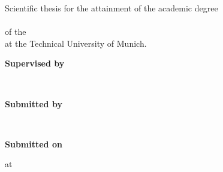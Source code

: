 \vspace*{125.2mm}
\fontsize{15pt}{17.5pt}\selectfont%
Scientific thesis for the attainment of the academic degree\\
\Grad\\
of the \Fakultaet{}\\ at the Technical University of Munich.
	
\renewcommand{\baselinestretch}{1.47}
\normalsize\selectfont
\vspace*{4.3mm}
\textbf{Supervised by}\tab
\begin{minipage}[t]{\textwidth-\CurrentLineWidth}
	\BetreutVonBetreuer\\
	\BetreutVonProf\strut
\end{minipage}
	
\textbf{Submitted by}\tab
\begin{minipage}[t]{\textwidth-\CurrentLineWidth}
	\EingereichtVon\\
	\Matrikelnummer
\end{minipage}
	
\textbf{Submitted on}\tab 
\begin{minipage}[t]{\textwidth-\CurrentLineWidth}
	\Datum{} at \Ort{}\strut
\end{minipage}


\pagestyle{empty}
\renewcommand*\chapterpagestyle{empty}
\tableofcontents%
\clearpage
\pagestyle{headings}
\renewcommand*\chapterpagestyle{headings}
\newpage%









\printacronyms[title={List of Abbreviations}]
{}
\clearpage
\newpage\null\thispagestyle{empty}\newpage
\listoffigures %


\listoftables %
\clearpage
\newpage\null\thispagestyle{empty}\newpage
\nocite{*}	%
%

\printbibliography

\clearpage



